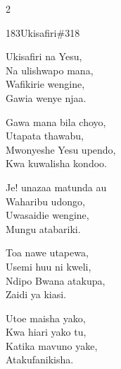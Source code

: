 \documentclass{article}
\begin{document}
\begin{multicols}{2}
\begin{hymn}{183}{Ukisafiri}{\#318}
\begin{stanza}
Ukisafiri na Yesu,\\
Na ulishwapo mana,\\
Wafikirie wengine,\\
Gawia wenye njaa.
\end{stanza}
\begin{chorus}
Gawa mana bila choyo,\\
Utapata thawabu,\\
Mwonyeshe Yesu upendo,\\
Kwa kuwalisha kondoo.
\end{chorus}
\begin{stanza}
Je! unazaa matunda au\\
Waharibu udongo,\\
Uwasaidie wengine,\\
Mungu atabariki.
\end{stanza}
\begin{stanza}
Toa nawe utapewa,\\
Usemi huu ni kweli,\\
Ndipo Bwana atakupa,\\
Zaidi ya kiasi.
\end{stanza}
\begin{stanza}
Utoe maisha yako,\\
Kwa hiari yako tu,\\
Katika mavuno yake,\\
Atakufanikisha.
\end{stanza}
\end{hymn}


\end{multicols}
\end{document}
